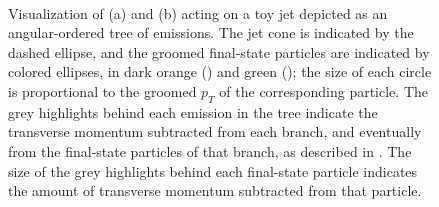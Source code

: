 \begin{figure}[t!]
      \centering
      \centerline{
      ~~~~
      } %
      \caption[Visualizations of recursive subtraction algorithms acting on toy jets.]{
    Visualization of (a)  and (b)  acting on a toy jet depicted as an angular-ordered tree of emissions.
    The jet cone is indicated by the dashed ellipse, and the groomed final-state particles are indicated by colored ellipses, in dark orange () and green ();
    the size of each circle is proportional to the groomed \(p_T\) of the corresponding particle.
    The grey highlights behind each emission in the tree indicate the transverse momentum subtracted from each branch, and eventually from the final-state particles of that branch, as described in .
    The size of the grey highlights behind each final-state particle indicates the amount of transverse momentum subtracted from that particle.
}
\label{fig:rsf_tree}
\end{figure}



